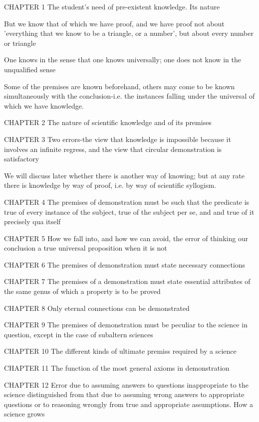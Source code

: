 CHAPTER 1
The student's need of pre-existent knowledge. Its nature

But we know that of which we have proof, and we have
proof not about 'everything that we know to be a triangle, or a
number', but about every number or triangle

One knows in the sense that one knows universally;
one does not know in the unqualified sense

Some of the premises are known beforehand, others may
come to be known simultaneously with the conclusion-i.e. the
instances falling under the universal of which we have knowledge.

CHAPTER 2
The nature of scientific knowledge and of its premises

CHAPTER 3
Two errors-the view that knowledge is impossible because it involves
an infinite regress, and the view that circular demonstration is
satisfactory

We will discuss later whether there is another way of
knowing; but at any rate there is knowledge by way of proof, i.e.
by way of scientific syllogism.

CHAPTER 4
The premises of demonstration must be such that the predicate is
true of every instance of the subject, true of the subject per se, and
and true of it precisely qua itself

CHAPTER 5
How we fall into, and how we can avoid, the error of thinking our
conclusion a true universal proposition when it is not

CHAPTER 6
The premises of demonstration must state necessary connections

CHAPTER 7
The premises of a demonstration must state essential attributes of
the same genus of which a property is to be proved

CHAPTER 8
Only eternal connections can be demonstrated

CHAPTER 9
The premises of demonstration must be peculiar to the science in
question, except in the case of subaltern sciences

CHAPTER 10
The different kinds of ultimate premiss required by a science

CHAPTER 11
The function of the most general axioms in demonstration

CHAPTER 12
Error due to assuming answers to questions inappropriate to the
science distinguished from that due to assuming wrong answers to
appropriate questions or to reasoning wrongly from true and
appropriate assumptions. How a science grows

